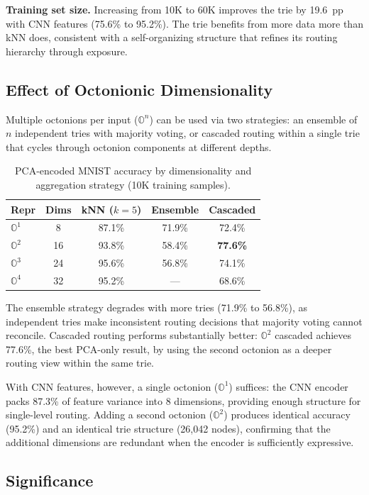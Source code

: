 \documentclass[11pt,a4paper]{article}
\theoremstyle{definition}
\theoremstyle{remark}
\newcommand{\Oct}{\mathbb{O}}
\begin{document}
\textbf{Training set size.} Increasing from 10K to 60K improves the trie by 19.6~pp with CNN features (75.6\% to 95.2\%). The trie benefits from more data more than kNN does, consistent with a self-organizing structure that refines its routing hierarchy through exposure.

\subsection{Effect of Octonionic Dimensionality}

Multiple octonions per input ($\Oct^n$) can be used via two strategies: an ensemble of $n$ independent tries with majority voting, or cascaded routing within a single trie that cycles through octonion components at different depths.

\begin{table}[ht]
\centering
\caption{PCA-encoded MNIST accuracy by dimensionality and aggregation strategy (10K training samples).}
\label{tab:mnist_dims}
\begin{tabular}{@{}lcccc@{}}
\toprule
Repr & Dims & kNN ($k{=}5$) & Ensemble & Cascaded \\
\midrule
$\Oct^1$ & 8  & 87.1\% & 71.9\% & 72.4\% \\
$\Oct^2$ & 16 & 93.8\% & 58.4\% & \textbf{77.6\%} \\
$\Oct^3$ & 24 & 95.6\% & 56.8\% & 74.1\% \\
$\Oct^4$ & 32 & 95.2\% & ---    & 68.6\% \\
\bottomrule
\end{tabular}
\end{table}

The ensemble strategy degrades with more tries (71.9\% to 56.8\%), as independent tries make inconsistent routing decisions that majority voting cannot reconcile. Cascaded routing performs substantially better: $\Oct^2$ cascaded achieves 77.6\%, the best PCA-only result, by using the second octonion as a deeper routing view within the same trie.

With CNN features, however, a single octonion ($\Oct^1$) suffices: the CNN encoder packs 87.3\% of feature variance into 8 dimensions, providing enough structure for single-level routing. Adding a second octonion ($\Oct^2$) produces identical accuracy (95.2\%) and an identical trie structure (26,042 nodes), confirming that the additional dimensions are redundant when the encoder is sufficiently expressive.

\subsection{Significance}
\end{document}
